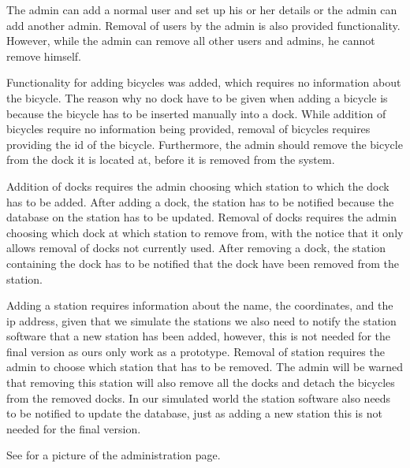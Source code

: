 \begin{description}[style=nextline]
\item[User] 
The admin can add a normal user and set up his or her details or the admin can add another admin.
Removal of users by the admin is also provided functionality.
However, while the admin can remove all other users and admins, he cannot remove himself.
\item[Bicycle] 
Functionality for adding bicycles was added, which requires no information about the bicycle.
The reason why no dock have to be given when adding a bicycle is because the bicycle has to be inserted manually into a dock.
While addition of bicycles require no information being provided, removal of bicycles requires providing the id of the bicycle.
Furthermore, the admin should remove the bicycle from the dock it is located at, before it is removed from the system.
\item[Dock] 
Addition of docks requires the admin choosing which station to which the dock has to be added.
After adding a dock, the station has to be notified because the database on the station has to be updated.
Removal of docks requires the admin choosing which dock at which station to remove from, with the notice that it only allows removal of docks not currently used.
After removing a dock, the station containing the dock has to be notified that the dock have been removed from the station.
\item[Station] 
Adding a station requires information about the name, the coordinates, and the ip address, given that we simulate the stations we also need to notify the station software that a new station has been added, however, this is not needed for the final version as ours only work as a prototype.
Removal of station requires the admin to choose which station that has to be removed.
The admin will be warned that removing this station will also remove all the docks and detach the bicycles from the removed docks.
In our simulated world the station software also needs to be notified to update the database, just as adding a new station this is not needed for the final version.
\end{description}
See  for a picture of the administration page.